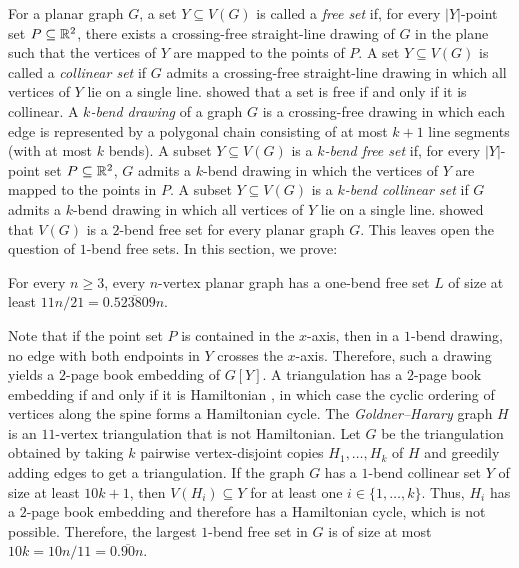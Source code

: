 \documentclass{patmorin}
\newcommand{\defin}[1]{\emph{\textcolor{brightmaroon}{#1}}}
\begin{document}
For a planar graph $G$, a set $Y\subseteq V(G)$ is called a \defin{free set} if, for every $|Y|$-point set $P\subseteq\mathbb{R}^2$, there exists a crossing-free straight-line drawing of $G$ in the plane such that the vertices of $Y$ are mapped to the points of $P$. A set $Y\subseteq V(G)$ is called a \defin{collinear set} if $G$ admits a crossing-free straight-line drawing in which all vertices of $Y$ lie on a single line. \citet{dujmovic.frati.ea:every} showed that a set is free if and only if it is collinear.
A \defin{$k$-bend drawing} of a graph $G$ is a crossing-free drawing in which each edge is represented by a polygonal chain consisting of at most $k+1$ line segments (with at most $k$ bends). A subset $Y\subseteq V(G)$ is a \defin{$k$-bend free set} if, for every $|Y|$-point set $P\subseteq\mathbb{R}^2$, $G$ admits a $k$-bend drawing in which the vertices of $Y$ are mapped to the points in $P$. A subset $Y\subseteq V(G)$ is a \defin{$k$-bend collinear set} if $G$ admits a $k$-bend drawing in which all vertices of $Y$ lie on a single line.
\citet{KaufmannWiese2002} showed that $V(G)$ is a $2$-bend free set for every planar graph $G$. This leaves open the question of $1$-bend free sets.
In this section, we prove:

\begin{thm}\label{one_bend_collinear_thm}
  For every $n\ge 3$, every $n$-vertex planar graph has a one-bend free set $L$ of size at least $11n/21=0.\overline{523809}n$. 
\end{thm}

Note that if the point set $P$ is contained in the $x$-axis, then in a $1$-bend drawing, no edge with both endpoints in $Y$ crosses the $x$-axis. Therefore, such a drawing yields a $2$-page book embedding of $G[Y]$. A triangulation has a $2$-page book embedding if and only if it is Hamiltonian \cite{bernhart.kainen:the}, in which case the cyclic ordering of vertices along the spine forms a Hamiltonian cycle.  The \defin{Goldner–Harary} graph $H$ is an $11$-vertex triangulation that is not Hamiltonian.  Let $G$ be the triangulation obtained by taking $k$ pairwise vertex-disjoint copies $H_1,\ldots,H_k$ of $H$ and greedily adding edges to get a triangulation.  If the graph $G$ has a $1$-bend collinear set $Y$ of size at least $10k+1$, then $V(H_i)\subseteq Y$ for at least one $i\in\{1,\ldots,k\}$.  Thus, $H_i$ has a $2$-page book embedding and therefore has a Hamiltonian cycle, which is not possible.  Therefore, the largest $1$-bend free set in $G$ is of size at most $10k = 10n/11=0.\overline{90}n$.
\end{document}

